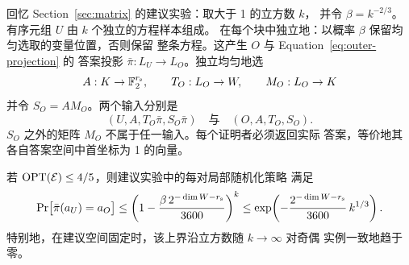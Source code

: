 回忆 Section~\ref{sec:matrix} 的建议实验：取大于 1 的立方数 $k$，
并令 $\beta=k^{-2/3}$。有序元组 $U$ 由 $k$ 个独立的方程样本组成。
在每个块中独立地：以概率 $\beta$ 保留均匀选取的变量位置，否则保留
整条方程。这产生 $O$ 与 Equation~\eqref{eq:outer-projection} 的
答案投影 $\bar\pi:L_U\to L_O$。独立均匀地选
\[
 A:K\to\mathbb F_2^{r_{\rm s}},\qquad
 T_O:L_O\to W,\qquad M_O:L_O\to K
\]
并令 $S_O=AM_O$。两个输入分别是
\begin{equation}
 (U,A,T_O\bar\pi,S_O\bar\pi)
 \quad\text{与}\quad
 (O,A,T_O,S_O).
 \label{eq:clean-advice-inputs}
\end{equation}
$S_O$ 之外的矩阵 $M_O$ 不属于任一输入。每个证明者必须返回实际
答案，等价地其各自答案空间中首坐标为 1 的向量。

\begin{lemma}[干净坐标界]
\label{lem:clean}
若 $\operatorname{OPT}(\mathcal E)\le 4/5$，则建议实验中的每对局部随机化策略
满足
\begin{equation}
 \Pr\bigl[\bar\pi(a_U)=a_O\bigr]
 \le \left(1-\frac{\beta\,2^{-\dim W-r_{\rm s}}}{3600}\right)^k
 \le
 \exp\!\left(
 -\frac{2^{-\dim W-r_{\rm s}}}{3600}\,k^{1/3}
 \right).
 \label{eq:clean-agreement-bound}
\end{equation}
特别地，在建议空间固定时，该上界沿立方数随 $k\to\infty$ 对奇偶
实例一致地趋于零。
\end{lemma}

